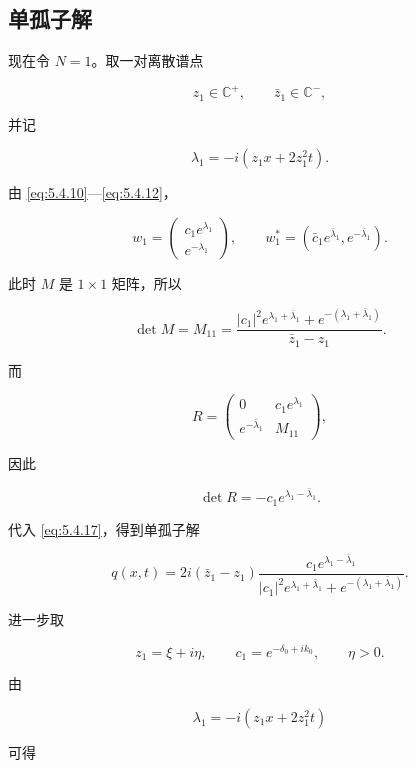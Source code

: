 \documentclass[
    lang=cn,
    scheme=chinese,
    mode=simple,
    device=normal,
    color=blue,
    math=cm,
    thmcnt=section,
    12pt
]{elegantbook}
\begin{document}
\subsection{单孤子解}

现在令 $N=1$。取一对离散谱点

\[
    z_1\in\mathbb{C}^+,
    \qquad
    \bar z_1\in\mathbb{C}^-,
\]

并记

\[
    \lambda_1
    =
    -i(z_1x+2z_1^2t).
\]

由 \eqref{eq:5.4.10}---\eqref{eq:5.4.12}，

\[
    w_1
    =
    \begin{pmatrix}
        c_1e^{\lambda_1} \\
        e^{-\lambda_1}
    \end{pmatrix},
    \qquad
    w_1^*
    =
    \left(
    \bar c_1e^{\bar\lambda_1},
    e^{-\bar\lambda_1}
    \right).
\]

此时 $M$ 是 $1\times1$ 矩阵，所以

\[
    \det M
    =
    M_{11}
    =
    \dfrac{
        \lvert c_1\rvert^2e^{\lambda_1+\bar\lambda_1}
        +
        e^{-(\lambda_1+\bar\lambda_1)}
    }{
        \bar z_1-z_1
    }.
\]

而

\[
    R=
    \begin{pmatrix}
        0                  & c_1e^{\lambda_1} \\
        e^{-\bar\lambda_1} & M_{11}
    \end{pmatrix},
\]

因此

\[
    \det R
    =
    -c_1e^{\lambda_1-\bar\lambda_1}.
\]

代入 \eqref{eq:5.4.17}，得到单孤子解

\begin{equation}
    q(x,t)
    =
    2i(\bar z_1-z_1)
    \dfrac{
        c_1e^{\lambda_1-\bar\lambda_1}
    }{
        \lvert c_1\rvert^2e^{\lambda_1+\bar\lambda_1}
        +
        e^{-(\lambda_1+\bar\lambda_1)}
    }.
    \tag{5.4.18}
    \label{eq:5.4.18}
\end{equation}

进一步取

\[
    z_1=\xi+i\eta,
    \qquad
    c_1=e^{-\delta_0+ik_0},
    \qquad
    \eta>0.
\]

由

\[
    \lambda_1=-i(z_1x+2z_1^2t)
\]

可得
\end{document}
